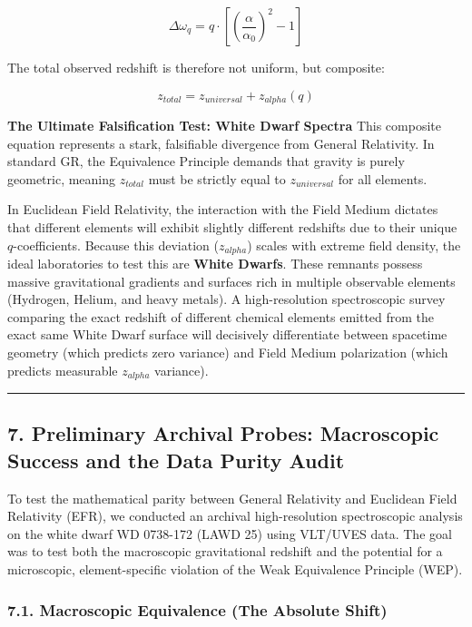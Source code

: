 \documentclass[
]{article}
\begin{document}
\[\Delta \omega_{q} = q \cdot \left[ \left( \frac{\alpha}{\alpha_0} \right)^2 - 1 \right]\]

The total observed redshift is therefore not uniform, but composite:

\[z_{total} = z_{universal} + z_{alpha}(q)\]

\textbf{The Ultimate Falsification Test: White Dwarf Spectra} This
composite equation represents a stark, falsifiable divergence from
General Relativity. In standard GR, the Equivalence Principle demands
that gravity is purely geometric, meaning \(z_{total}\) must be strictly
equal to \(z_{universal}\) for all elements.

In Euclidean Field Relativity, the interaction with the Field Medium
dictates that different elements will exhibit slightly different
redshifts due to their unique \(q\)-coefficients. Because this deviation
(\(z_{alpha}\)) scales with extreme field density, the ideal
laboratories to test this are \textbf{White Dwarfs}. These remnants
possess massive gravitational gradients and surfaces rich in multiple
observable elements (Hydrogen, Helium, and heavy metals). A
high-resolution spectroscopic survey comparing the exact redshift of
different chemical elements emitted from the exact same White Dwarf
surface will decisively differentiate between spacetime geometry (which
predicts zero variance) and Field Medium polarization (which predicts
measurable \(z_{alpha}\) variance).

\begin{center}\rule{0.5\linewidth}{0.5pt}\end{center}

\subsection{7. Preliminary Archival Probes: Macroscopic Success and the
Data Purity
Audit}\label{preliminary-archival-probes-macroscopic-success-and-the-data-purity-audit}

To test the mathematical parity between General Relativity and Euclidean
Field Relativity (EFR), we conducted an archival high-resolution
spectroscopic analysis on the white dwarf WD 0738-172 (LAWD 25) using
VLT/UVES data. The goal was to test both the macroscopic gravitational
redshift and the potential for a microscopic, element-specific violation
of the Weak Equivalence Principle (WEP).

\subsubsection{7.1. Macroscopic Equivalence (The Absolute
Shift)}\label{macroscopic-equivalence-the-absolute-shift}
\end{document}
